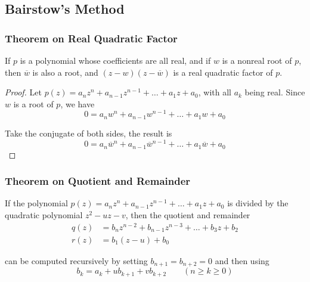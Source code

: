 \documentclass[notheorems,mathserif,table,compress]{beamer}  %
\begin{document}
\subsection{Bairstow's Method}

\begin{frame}
\frametitle{Theorem on Real Quadratic Factor}
\begin{theorem}
If $p$ is a polynomial whose coefficients are all real, and if $w$ is a nonreal root of $p$, then $\overline{w}$ is also a root, and $(z-w)(z-\overline w)$ is a real quadratic factor of $p$.
\end{theorem}

\begin{proof}
Let $p(z)=a_n z^n+a_{n-1} z^{n-1}+\ldots+a_1 z+a_0$, with all $a_k$ being real. Since $w$ is a root of $p$, we have
\begin{displaymath}
0=a_n w^n+a_{n-1} w^{n-1}+\ldots+a_1 w+a_0
\end{displaymath}

Take the conjugate of both sides, the result is
\begin{displaymath}
0=a_n {\overline w}^n+a_{n-1} {\overline w}^{n-1}+\ldots+a_1 \overline w+a_0
\end{displaymath}

\end{proof}
\end{frame}

\begin{frame}
\frametitle{Theorem on Quotient and Remainder}
\begin{theorem}
If the polynomial $p(z)=a_n z^n+a_{n-1} z^{n-1}+\ldots+a_1 z+a_0$ is divided by the quadratic polynomial $z^2-uz-v$, then the quotient and remainder
\begin{equation*}
\begin{split}
q(z) & =b_n z^{n-2}+b_{n-1} z^{n-3}+\ldots+b_3 z+b_2\\
r(z) & =b_1(z-u)+b_0
\end{split}
\end{equation*}

can be computed recursively by setting $b_{n+1}=b_{n+2}=0$ and then using
\begin{displaymath}
b_k=a_k+ub_{k+1}+vb_{k+2} \qquad (n\geq k\geq 0)
\end{displaymath}

\end{theorem}
\end{frame}
\end{document}
